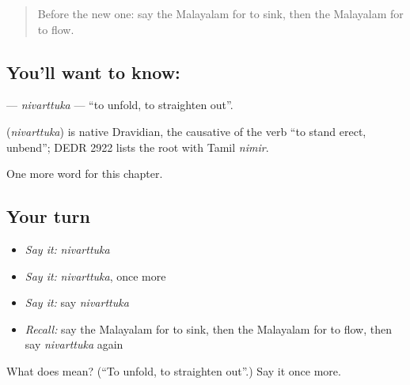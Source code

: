\label{lesson:ML-C232-nivarttuka}



\begin{quote}
Before the new one: say the Malayalam for to sink, then the Malayalam for to flow.
\end{quote}

\subsection*{You'll want to know: }
\textbf{} — \emph{nivarttuka} — \textquotedblleft{}to unfold, to straighten out\textquotedblright{}.

\begin{cousinweb}
\textbf{} (\emph{nivarttuka}) is native Dravidian, the causative of the verb \textquotedblleft{}to stand erect, unbend\textquotedblright{}; DEDR 2922 lists the root with Tamil \emph{nimir}.
\end{cousinweb}

\begin{grammarlens}[title={What you've built}]
One more word for this chapter.
\end{grammarlens}

\subsection*{Your turn}
\begin{itemize}
\raggedright
  \item \emph{Say it:} \emph{nivarttuka}
  \item \emph{Say it:} \emph{nivarttuka}, once more
  \item \emph{Say it:} say \emph{nivarttuka}
  \item \emph{Recall:} say the Malayalam for to sink, then the Malayalam for to flow, then say \emph{nivarttuka} again
\end{itemize}

\begin{tcolorbox}[breakable,colback=teal!4,colframe=teal!35!black,title={Before you move on}]
What does  mean? (\textquotedblleft{}To unfold, to straighten out\textquotedblright{}.) Say it once more.
\end{tcolorbox}
